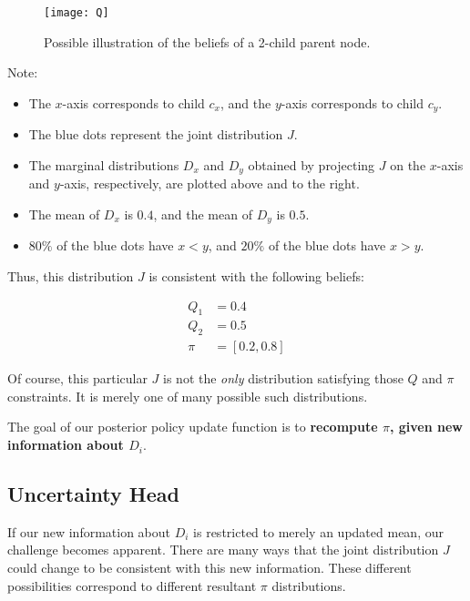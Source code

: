 \documentclass[tikz]{article}
\begin{document}
\begin{figure}[h]
\caption{Possible illustration of the beliefs of a 2-child parent node.}
\label{Q-figure}
\centering
\texttt{[image: Q]}
\end{figure}

\newpage 

Note:

\begin{itemize}
    \item The $x$-axis corresponds to child $c_x$, and the $y$-axis corresponds to child $c_y$.
    \item The blue dots represent the joint distribution $J$.
    \item The marginal distributions $D_x$ and $D_y$ obtained by projecting $J$ on the $x$-axis and $y$-axis, respectively, are plotted above and to the right.
    \item The mean of $D_x$ is $0.4$, and the mean of $D_y$ is $0.5$.
    \item $80\%$ of the blue dots have $x<y$, and $20\%$ of the blue dots have $x>y$.
\end{itemize}

Thus, this distribution $J$ is consistent with the following beliefs:

\begin{align*}
Q_1 &= 0.4 \\
Q_2 &= 0.5 \\
\pi &= [0.2, 0.8]
\end{align*}

Of course, this particular $J$ is not the \emph{only} distribution satisfying those $Q$ and $\pi$ constraints. It is merely one of
many possible such distributions. \newline

The goal of our posterior policy update function is to \textbf{recompute $\pi$, given new information about $D_i$}.

\subsection{Uncertainty Head}

If our new information about $D_i$ is restricted to merely an updated mean, our challenge becomes apparent. There are many ways that the joint 
distribution $J$ could change to be consistent with this new information. These different possibilities correspond to different
resultant $\pi$ distributions. \newline
\end{document}
